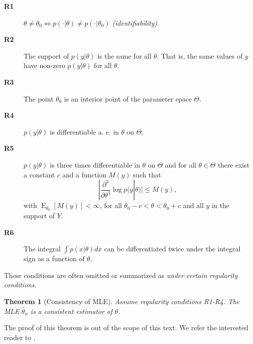 \documentclass{book}
\theoremstyle{plain}%
\newtheorem{theorem}{Theorem}[section]
\theoremstyle{definition}
\DeclareMathOperator{\E}{E}
\newlength{\arrow}
\begin{document}
\begin{description}
\item[\textbf{R1}] $\theta \neq \theta_0 \Leftrightarrow p(\cdot|\theta) \neq p(\cdot|\theta_0)$ \emph{(identifiability)}.
\item[\textbf{R2}] The support of $p(y|\theta)$ is the same for all $\theta$. That is, the same values of $y$ have non-zero $p(y|\theta)$ for all $\theta$.
\item[\textbf{R3}] The point $\theta_0$ is an interior point of the parameter space $\Theta$.
\item[\textbf{R4}] $p(y|\theta)$ is differentiable a. e. in $\theta$ on $\Theta$.
\item[\textbf{R5}] $p(y|\theta)$ is three times differentiable in $\theta$ on $\Theta$ and for all $\theta \in \Theta$ there exist a constant $c$ and a function $M(y)$ such that $$|\frac{\partial^3}{\partial \theta^3} \log p(y|\theta)| \leq M(y),$$
with $\E_{\theta_0}[M(y)] < \infty$, for all $\theta_0 - c < \theta < \theta_0 + c$ and all $y$ in the support of $Y$.
\item[\textbf{R6}] The integral $\int p(x|\theta)dx$ can be differentiated twice under the integral sign as a function of $\theta$.
\end{description}

These conditions are often omitted or summarized as \emph{under certain regularity conditions}.

\begin{theorem}[Consistency of MLE] Assume regularity conditions R1-R4. The MLE $\hat{\theta}_n$ is a consistent estimator of $\theta$.
\end{theorem}

The proof of this theorem is out of the scope of this text. We refer the interested reader to \citet[ch. 6.]{Hogg2005}.
\end{document}

